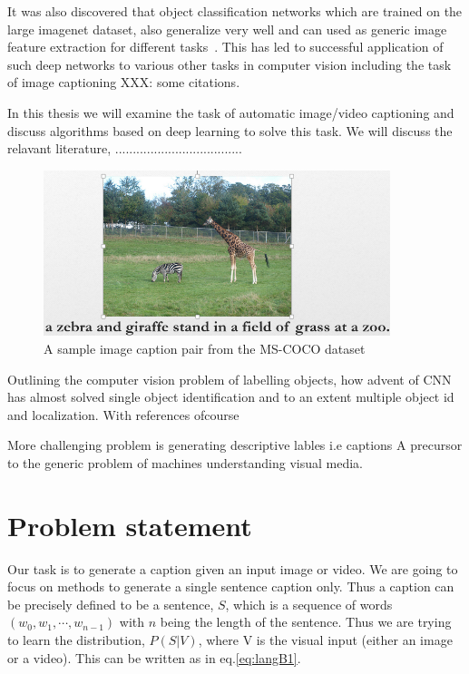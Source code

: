 It was also discovered that object classification networks which are trained on
the large imagenet dataset, also generalize very well and can used as generic
image feature extraction for different tasks~\cite{yosinski2014transferable}.
This has led to successful application of such deep networks to various other
tasks in computer vision including the task of image captioning XXX: some
citations.

In this thesis we will examine the task of automatic image/video captioning and
discuss algorithms based on deep learning to solve this task. We will discuss
the relavant literature, ....................................


\begin{figure}[h]
	\centering
	\includegraphics[width=0.9\textwidth]{./images/ExampleCaption.png}
	\caption{A sample image caption pair from the MS-COCO dataset}
	\label{fig:ExampleCap}
\end{figure}


Outlining the computer vision problem of labelling objects, how advent of CNN
has almost solved single object identification and to an extent multiple object
id and localization. With references ofcourse

More challenging problem is generating descriptive lables i.e captions
A precursor to the generic problem of machines understanding visual media. 


\section{Problem statement}

Our task is to generate a caption given an input image or video. We are going to
focus on methods to generate a single sentence caption only. Thus a caption can
be precisely defined to be a sentence, $S$, which is a sequence of words $(w_0,
w_1,\cdots, w_{n-1})$ with $n$ being the length of the sentence. Thus we are
trying to learn the distribution, $P(S|V)$, where V is the visual input (either
an image or a video). This can be written as in eq.\ref{eq:langB1}. 


